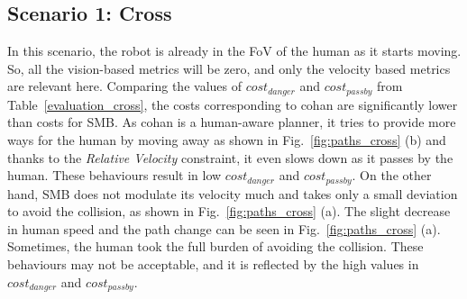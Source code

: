 \subsection{Scenario 1: Cross}
In this scenario, the robot is already in the FoV of the human as it starts moving. So, all the vision-based metrics will be zero, and only the velocity based metrics are relevant here. Comparing the values of $cost_{danger}$ and $cost_{passby}$ from Table~\ref{evaluation_cross}, the costs corresponding to \acrshort{cohan} are significantly lower than costs for SMB. As \acrshort{cohan} is a human-aware planner, it tries to provide more ways for the human by moving away as shown in Fig.~\ref{fig:paths_cross} (b) and thanks to the \textit{Relative Velocity} constraint, it even slows down as it passes by the human. These behaviours result in low $cost_{danger}$ and $cost_{passby}$. On the other hand, SMB does not modulate its velocity much and takes only a small deviation to avoid the collision, as shown in Fig.~\ref{fig:paths_cross} (a). The slight decrease in human speed and the path change can be seen in Fig.~\ref{fig:paths_cross} (a). Sometimes, the human took the full burden of avoiding the collision. These behaviours may not be acceptable, and it is reflected by the high values in $cost_{danger}$ and $cost_{passby}$.

